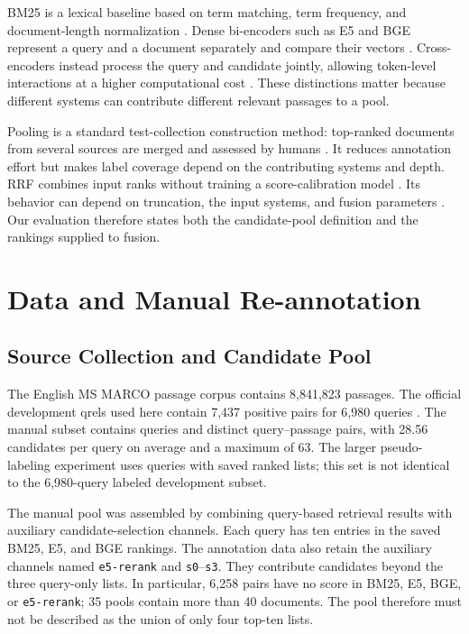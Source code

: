\documentclass[runningheads,a4paper]{llncs}
\begin{document}
BM25 is a lexical baseline based on term matching, term frequency, and document-length normalization \cite{robertson2009bm25}. Dense bi-encoders such as E5 and BGE represent a query and a document separately and compare their vectors \cite{wang2022e5,xiao2023cpack}. Cross-encoders instead process the query and candidate jointly, allowing token-level interactions at a higher computational cost \cite{nogueira2019bert}. These distinctions matter because different systems can contribute different relevant passages to a pool.

Pooling is a standard test-collection construction method: top-ranked documents from several sources are merged and assessed by humans \cite{voorhees2005trec}. It reduces annotation effort but makes label coverage depend on the contributing systems and depth. RRF combines input ranks without training a score-calibration model \cite{cormack2009rrf}. Its behavior can depend on truncation, the input systems, and fusion parameters \cite{bruch2023fusion}. Our evaluation therefore states both the candidate-pool definition and the rankings supplied to fusion.

\section{Data and Manual Re-annotation}
\label{sec:data}

\subsection{Source Collection and Candidate Pool}

The English MS MARCO passage corpus contains 8,841,823 passages. The official development qrels used here contain 7,437 positive pairs for 6,980 queries \cite{msmarco_datasets}. The manual subset contains \ManualQueryCount{} queries and \ManualPairCount{} distinct query--passage pairs, with 28.56 candidates per query on average and a maximum of 63. The larger pseudo-labeling experiment uses \FullQueryCount{} queries with saved ranked lists; this set is not identical to the 6,980-query labeled development subset.

The manual pool was assembled by combining query-based retrieval results with auxiliary candidate-selection channels. Each query has ten entries in the saved BM25, E5, and BGE rankings. The annotation data also retain the auxiliary channels named \texttt{e5-rerank} and \texttt{s0}--\texttt{s3}. They contribute candidates beyond the three query-only lists. In particular, 6,258 pairs have no score in BM25, E5, BGE, or \texttt{e5-rerank}; 35 pools contain more than 40 documents. The pool therefore must not be described as the union of only four top-ten lists.
\end{document}

